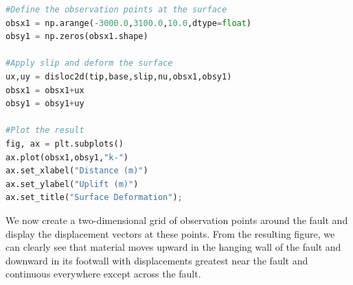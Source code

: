 \documentclass[a4paper , 12pt]{book}
\begin{document}
\begin{center}
\begin{lstlisting}[language=Python, frame=single]
#Define the observation points at the surface
obsx1 = np.arange(-3000.0,3100.0,10.0,dtype=float)
obsy1 = np.zeros(obsx1.shape)

#Apply slip and deform the surface
ux,uy = disloc2d(tip,base,slip,nu,obsx1,obsy1)
obsx1 = obsx1+ux
obsy1 = obsy1+uy

#Plot the result
fig, ax = plt.subplots()
ax.plot(obsx1,obsy1,"k-")
ax.set_xlabel("Distance (m)")
ax.set_ylabel("Uplift (m)")
ax.set_title("Surface Deformation");
\end{lstlisting}
\end{center}

We now create a two-dimensional grid of observation points around the fault and display the displacement vectors at these points. From the resulting figure, we can clearly see that material moves upward in the hanging wall of the fault and downward in its footwall with displacements greatest near the fault and continuous everywhere except across the fault.
\end{document}
